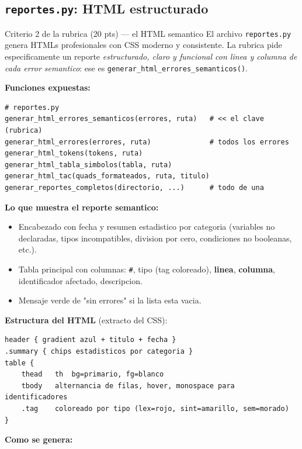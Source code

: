 \documentclass[11pt,a4paper]{article}
\begin{document}
\subsection{\texttt{reportes.py}: HTML estructurado}

\begin{rubrica}{Criterio 2 de la rubrica (20 pts) --- el HTML semantico}
El archivo \texttt{reportes.py} genera HTMLs profesionales con CSS
moderno y consistente. La rubrica pide especificamente un reporte
\emph{estructurado, claro y funcional con linea y columna de cada error
semantico}: ese es \texttt{generar\_html\_errores\_semanticos()}.
\end{rubrica}

\textbf{Funciones expuestas:}

\begin{lstlisting}[style=py]
# reportes.py
generar_html_errores_semanticos(errores, ruta)   # << el clave (rubrica)
generar_html_errores(errores, ruta)              # todos los errores
generar_html_tokens(tokens, ruta)
generar_html_tabla_simbolos(tabla, ruta)
generar_html_tac(quads_formateados, ruta, titulo)
generar_reportes_completos(directorio, ...)      # todo de una
\end{lstlisting}

\textbf{Lo que muestra el reporte semantico:}
\begin{itemize}[leftmargin=*,nosep]
  \item Encabezado con fecha y resumen estadistico por categoria
        (variables no declaradas, tipos incompatibles, division por
        cero, condiciones no booleanas, etc.).
  \item Tabla principal con columnas: \texttt{\#}, tipo (tag
        coloreado), \textbf{linea}, \textbf{columna}, identificador
        afectado, descripcion.
  \item Mensaje verde de "sin errores" si la lista esta vacia.
\end{itemize}

\textbf{Estructura del HTML} (extracto del CSS):

\begin{lstlisting}[style=tac]
header { gradient azul + titulo + fecha }
.summary { chips estadisticos por categoria }
table {
    thead   th  bg=primario, fg=blanco
    tbody   alternancia de filas, hover, monospace para identificadores
    .tag    coloreado por tipo (lex=rojo, sint=amarillo, sem=morado)
}
\end{lstlisting}

\textbf{Como se genera:}
\end{document}
